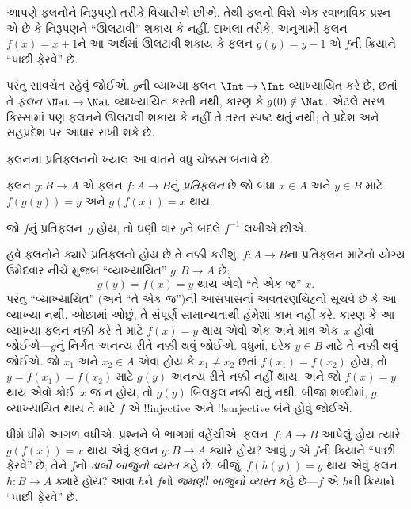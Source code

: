 \documentclass[../../../include/open-logic-section]{subfiles}
\begin{document}

\begin{explain}
આપણે ફલનોને નિરૂપણો તરીકે વિચારીએ છીએ. તેથી ફલનો
વિશે એક સ્વાભાવિક પ્રશ્ન એ છે કે નિરૂપણને “ઊલટાવી”
શકાય કે નહીં. દાખલા તરીકે, અનુગામી ફલન
$f(x) = x + 1$ને આ અર્થમાં ઊલટાવી શકાય કે ફલન
$g(y) = y - 1$ એ $f$ની ક્રિયાને “પાછી ફેરવે” છે.

પરંતુ સાવચેત રહેવું જોઈએ. $g$ની વ્યાખ્યા ફલન
$\Int \to \Int$ વ્યાખ્યાયિત કરે છે, છતાં તે
\emph{ફલન} $\Nat
\to \Nat$ વ્યાખ્યાયિત કરતી નથી, કારણ કે
$g(0) \notin \Nat$. એટલે સરળ કિસ્સામાં પણ ફલનને
ઊલટાવી શકાય કે નહીં તે તરત સ્પષ્ટ થતું નથી;
તે પ્રદેશ અને સહપ્રદેશ પર આધાર રાખી શકે છે.

ફલનના પ્રતિફલનનો ખ્યાલ આ વાતને વધુ ચોક્કસ બનાવે છે.
\end{explain}

\begin{defn}
ફલન $g \colon B \to A$ એ ફલન $f
\colon A \to B$નું \emph{પ્રતિફલન} છે જો બધા
$x \in A$ અને $y \in B$ માટે
$f(g(y)) = y$ અને $g(f(x)) = x$ થાય.
\end{defn}

જો $f$નું પ્રતિફલન~$g$ હોય, તો ઘણી વાર $g$ને
બદલે $f^{-1}$ લખીએ છીએ.

\begin{explain}
હવે ફલનોને ક્યારે પ્રતિફલનો હોય છે તે નક્કી કરીશું.
$f\colon A \to B$ના પ્રતિફલન માટેનો યોગ્ય ઉમેદવાર
નીચે મુજબ “વ્યાખ્યાયિત” $g\colon B \to A$ છે:
\[
g(y) = \text{$f(x) = y$ થાય એવો “તે એક જ” $x$.}
\]
પરંતુ “વ્યાખ્યાયિત” (અને “તે એક જ”)ની આસપાસનાં
અવતરણચિહ્નો સૂચવે છે કે આ વ્યાખ્યા નથી. ઓછામાં ઓછું,
તે સંપૂર્ણ સામાન્યતાથી હંમેશાં કામ નહીં કરે. કારણ કે
આ વ્યાખ્યા ફલન નક્કી કરે તે માટે $f(x) =
y$ થાય એવો એક અને માત્ર એક~$x$ હોવો જોઈએ---$g$નું
નિર્ગત અનન્ય રીતે નક્કી થવું જોઈએ. વધુમાં, દરેક
$y \in B$ માટે તે નક્કી થવું જોઈએ. જો $x_1$ અને
$x_2 \in
A$ એવા હોય કે $x_1 \neq x_2$ છતાં
$f(x_1) = f(x_2)$ હોય, તો $y = f(x_1) = f(x_2)$
માટે $g(y)$ અનન્ય રીતે નક્કી નહીં થાય. અને જો
$f(x) = y$ થાય એવો કોઈ~$x$ જ ન હોય, તો
$g(y)$ બિલકુલ નક્કી થતું નથી. બીજા શબ્દોમાં,
$g$ વ્યાખ્યાયિત થાય તે માટે $f$ એ !!{injective}
અને !!{surjective} બંને હોવું જોઈએ.

ધીમે ધીમે આગળ વધીએ. પ્રશ્નને બે ભાગમાં વહેંચીએ:
ફલન~$f\colon A \to B$ આપેલું હોય ત્યારે
$g(f(x)) = x$ થાય એવું ફલન $g\colon B \to A$
ક્યારે હોય? આવું $g$ એ $f$ની ક્રિયાને “પાછી ફેરવે” છે;
તેને $f$નો \emph{ડાબી બાજુનો વ્યસ્ત} કહે છે.
બીજું, $f(h(y)) = y$ થાય એવું ફલન
$h\colon B \to A$ ક્યારે હોય? આવા $h$ને
$f$નો \emph{જમણી બાજુનો વ્યસ્ત} કહે છે---$f$
એ $h$ની ક્રિયાને “પાછી ફેરવે” છે.
\end{explain}
\end{document}
